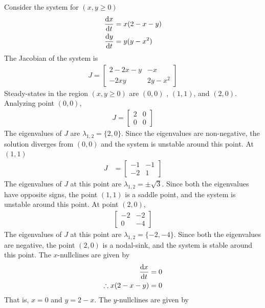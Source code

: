 \documentclass[12pt,1in]{article}
\newenvironment{Example}[2][Example]{\begin{trivlist}
		\item[\hskip \labelsep {\bfseries #1}\hskip \labelsep {\bfseries #2.}]}{\end{trivlist}}
\begin{document}
\begin{Example}{2}
	\cite[p.~488]{diff_eq}
	Consider the system for $(x,y \geq 0)$
	\begin{align*}
	\derivative{x}{t} &= x(2 - x - y)\\
	\derivative{y}{t} &= y(y - x^2)
	\end{align*}
	The Jacobian of the system is
	\begin{align*}
	J = \begin{bmatrix}
	2 -2x  -y & -x \\
	-2xy & 2y - x^2 
	\end{bmatrix}
	\end{align*}
	Steady-states in the region $(x,y \geq 0)$ are $(0,0)$ , $(1,1)$, and $(2,0)$. Analyzing point $(0,0)$,
	\begin{align*}
	J = \begin{bmatrix}
	2 & 0 \\
	0 & 0
	\end{bmatrix}
	\end{align*}
	The eigenvalues of $J$ are $\lambda_{1,2} = \{2, 0\}$. Since the eigenvalues are non-negative, the solution diverges from $(0,0)$ and the system is unstable around this point. 
	At $(1,1)$
	\begin{align*}
	J &= \begin{bmatrix}
	-1 & -1 \\
	-2 & 1
	\end{bmatrix}
	\end{align*}
	The eigenvalues of $J$ at this point are $\lambda_{1,2} = \pm \sqrt{3}$. Since both the eigenvalues have opposite signs, the point $(1,1)$ is a saddle point, and the system is unstable around this point. At point $(2,0)$,
	\begin{align*}
	\begin{bmatrix}
	-2 & -2 \\
	0 & - 4
	\end{bmatrix}
	\end{align*} 
	The eigenvalues of $J$ at this point are $\lambda_{1,2} = \{-2,-4\}$. Since both the eigenvalues are negative, the point $(2,0)$ is a nodal-sink, and the system is stable around this point. The $x$-nullclines are given by 
	\begin{align*}
	\derivative{x}{t} &= 0 \\
	\therefore x(2 - x - y) &= 0
	\end{align*}
	That is, $x = 0$ and $y = 2 - x$. The $y$-nullclines are given by 
	\begin{align*}

\end{align*}
\end{Example}
\end{document}
